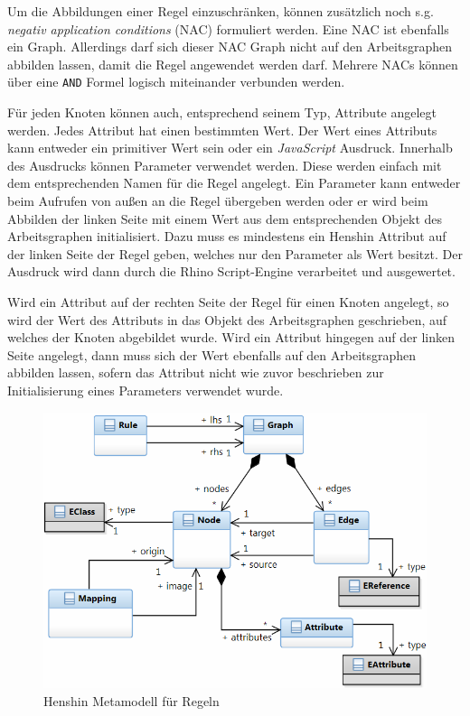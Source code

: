 Um die Abbildungen einer Regel einzuschränken, können zusätzlich noch s.g. \textit{negativ
application conditions} (NAC) formuliert werden. Eine NAC ist ebenfalls ein Graph. Allerdings darf
sich dieser NAC Graph nicht auf den Arbeitsgraphen abbilden lassen, damit die Regel angewendet
werden darf. Mehrere NACs können über eine \texttt{AND} Formel logisch miteinander verbunden werden.

Für jeden Knoten können auch, entsprechend seinem Typ, Attribute angelegt werden. Jedes Attribut hat
einen bestimmten Wert. Der Wert eines Attributs kann entweder ein primitiver Wert sein oder ein
\textit{JavaScript} Ausdruck. Innerhalb des Ausdrucks können Parameter verwendet werden. Diese
werden einfach mit dem entsprechenden Namen für die Regel angelegt. Ein Parameter kann entweder beim
Aufrufen von außen an die Regel übergeben werden oder er wird beim Abbilden der linken
Seite mit einem Wert aus dem entsprechenden Objekt des Arbeitsgraphen initialisiert. Dazu muss es
mindestens ein Henshin Attribut auf der linken Seite der Regel geben, welches nur den Parameter
als Wert besitzt. Der Ausdruck wird dann durch die Rhino Script-Engine \cite{RIHNO}  verarbeitet und
ausgewertet.

Wird ein Attribut auf der rechten Seite der Regel für einen Knoten angelegt, so wird der Wert des
Attributs in das Objekt des Arbeitsgraphen geschrieben, auf welches der Knoten abgebildet wurde.
Wird ein Attribut hingegen auf der linken Seite angelegt, dann muss sich der Wert ebenfalls auf den
Arbeitsgraphen abbilden lassen, sofern das Attribut nicht wie zuvor beschrieben zur Initialisierung
eines Parameters verwendet wurde.

\begin{figure}[htb]
  \centering
  \includegraphics[scale=0.7]{images/henshin_metamodel.png}
  \caption{Henshin Metamodell für Regeln}
  \label{fig:henshin_metamodel}
\end{figure}

